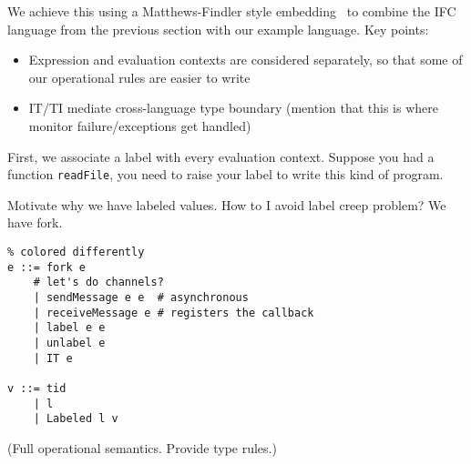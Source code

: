 We achieve this using a Matthews-Findler style embedding~\nocite{} to combine
the IFC language from the previous section with our example language.  Key points:


\begin{itemize}
    \item Expression and evaluation contexts are considered separately,
        so that some of our operational rules are easier to write
    \item IT/TI mediate cross-language type boundary (mention that this
        is where monitor failure/exceptions get handled)
\end{itemize}

First, we associate a label with every evaluation context.  Suppose you had
a function \verb|readFile|, you need to raise your label to write this
kind of program.

Motivate why we have labeled values. How to I avoid label creep problem? We
have fork. 



\begin{verbatim}
% colored differently
e ::= fork e
    # let's do channels?
    | sendMessage e e  # asynchronous
    | receiveMessage e # registers the callback
    | label e e
    | unlabel e
    | IT e

v ::= tid
    | l
    | Labeled l v
\end{verbatim}


%

(Full operational semantics. Provide type rules.)




